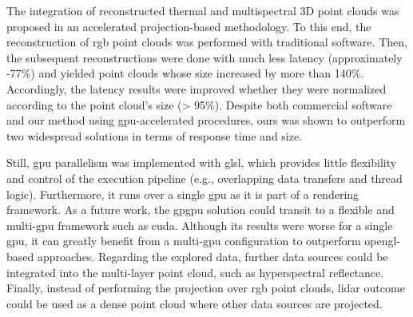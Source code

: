 The integration of reconstructed thermal and multispectral 3D point clouds was proposed in an accelerated projection-based methodology. To this end, the reconstruction of \acrshort{rgb} point clouds was performed with traditional software. Then, the subsequent reconstructions were done with much less latency (approximately -77\%) and yielded point clouds whose size increased by more than 140\%. Accordingly, the latency results were improved whether they were normalized according to the point cloud's size (> 95\%). Despite both commercial software and our method using \acrshort{gpu}-accelerated procedures, ours was shown to outperform two widespread solutions in terms of response time and size. 

Still, \acrshort{gpu} parallelism was implemented with \acrshort{glsl}, which provides little flexibility and control of the execution pipeline (e.g., overlapping data transfers and thread logic). Furthermore, it runs over a single \acrshort{gpu} as it is part of a rendering framework. As a future work, the \acrshort{gpgpu} solution could transit to a flexible and multi-\acrshort{gpu} framework such as \acrshort{cuda}. Although its results were worse for a single \acrshort{gpu}, it can greatly benefit from a multi-\acrshort{gpu} configuration to outperform \acrshort{opengl}-based approaches. Regarding the explored data, further data sources could be integrated into the multi-layer point cloud, such as hyperspectral reflectance. Finally, instead of performing the projection over \acrshort{rgb} point clouds, \acrshort{lidar} outcome could be used as a dense point cloud where other data sources are projected.  

